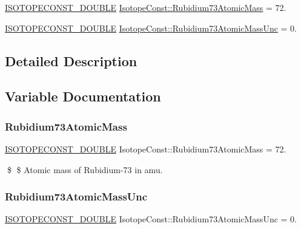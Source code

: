 \begin{DoxyCompactItemize}
\item 
\mbox{\hyperlink{group___isotope_const-_macros_ga8f45a7272ce02c0b4c65c44636ed719a}{I\+S\+O\+T\+O\+P\+E\+C\+O\+N\+S\+T\+\_\+\+D\+O\+U\+B\+LE}} \mbox{\hyperlink{group___isotope_const-_rubidium-_rb73_ga634717f2100b837eecb53b656808a29c}{Isotope\+Const\+::\+Rubidium73\+Atomic\+Mass}} = 72.
\item 
\mbox{\hyperlink{group___isotope_const-_macros_ga8f45a7272ce02c0b4c65c44636ed719a}{I\+S\+O\+T\+O\+P\+E\+C\+O\+N\+S\+T\+\_\+\+D\+O\+U\+B\+LE}} \mbox{\hyperlink{group___isotope_const-_rubidium-_rb73_ga77376e34bb5e390d02d630e28a1f4014}{Isotope\+Const\+::\+Rubidium73\+Atomic\+Mass\+Unc}} = 0.
\end{DoxyCompactItemize}


\subsection{Detailed Description}


\subsection{Variable Documentation}
\mbox{\label{group___isotope_const-_rubidium-_rb73_ga634717f2100b837eecb53b656808a29c}} 
\subsubsection{\texorpdfstring{Rubidium73\+Atomic\+Mass}{Rubidium73AtomicMass}}
{\footnotesize\ttfamily \mbox{\hyperlink{group___isotope_const-_macros_ga8f45a7272ce02c0b4c65c44636ed719a}{I\+S\+O\+T\+O\+P\+E\+C\+O\+N\+S\+T\+\_\+\+D\+O\+U\+B\+LE}} Isotope\+Const\+::\+Rubidium73\+Atomic\+Mass = 72.}

\$ \$ Atomic mass of Rubidium-\/73 in amu. \mbox{\label{group___isotope_const-_rubidium-_rb73_ga77376e34bb5e390d02d630e28a1f4014}} 
\subsubsection{\texorpdfstring{Rubidium73\+Atomic\+Mass\+Unc}{Rubidium73AtomicMassUnc}}
{\footnotesize\ttfamily \mbox{\hyperlink{group___isotope_const-_macros_ga8f45a7272ce02c0b4c65c44636ed719a}{I\+S\+O\+T\+O\+P\+E\+C\+O\+N\+S\+T\+\_\+\+D\+O\+U\+B\+LE}} Isotope\+Const\+::\+Rubidium73\+Atomic\+Mass\+Unc = 0.}

